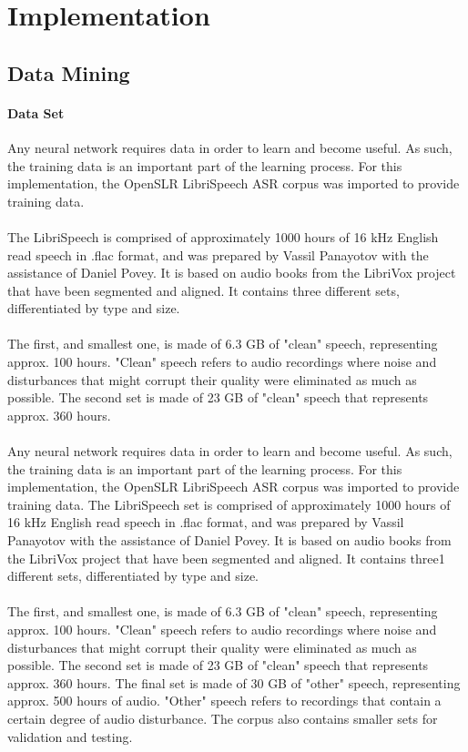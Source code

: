 \chapter{Implementation}\label{ch:implementation}

\section{Data Mining} \label{sec:DataMining}
\subsubsection{Data Set}
Any neural network requires data in order to learn and become useful. As such, the training data is an important part of the learning process. For this implementation, the OpenSLR LibriSpeech ASR corpus was imported to provide training data.\\\\
The LibriSpeech is comprised of approximately 1000 hours of 16 kHz English read speech in .flac format, and was prepared by Vassil Panayotov with the assistance of Daniel Povey. It is based on audio books from the LibriVox project that have been segmented and aligned. It contains three different sets, differentiated by type and size.\\\\
The first, and smallest one, is made of 6.3 GB of "clean" speech, representing approx. 100 hours. "Clean" speech refers to audio recordings where noise and disturbances that might corrupt their quality were eliminated as much as possible.
The second set is made of 23 GB of "clean" speech that represents approx. 360 hours.\\\\
Any neural network requires data in order to learn and become useful. As such, the training data is an important part of the learning process. For this implementation, the OpenSLR LibriSpeech ASR corpus was imported to provide training data.
The LibriSpeech set is comprised of approximately 1000 hours of 16 kHz English read speech in .flac format, and was prepared by Vassil Panayotov with the assistance of Daniel Povey. It is based on audio books from the LibriVox project that have been segmented and aligned. It contains three1 different sets, differentiated by type and size.\\\\
The first, and smallest one, is made of 6.3 GB of "clean" speech, representing approx. 100 hours. "Clean" speech refers to audio recordings where noise and disturbances that might corrupt their quality were eliminated as much as possible.
The second set is made of 23 GB of "clean" speech that represents approx. 360 hours.
The final set is made of 30 GB of "other" speech, representing approx. 500 hours of audio. "Other" speech refers to recordings that contain a certain degree of audio disturbance.
The corpus also contains smaller sets for validation and testing.

